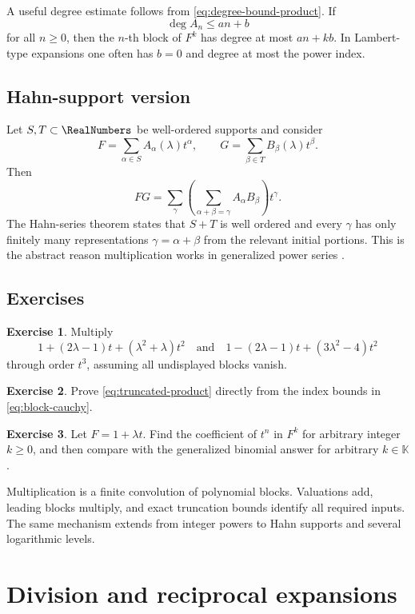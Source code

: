 \documentclass[11pt,openany]{book}
\theoremstyle{definition}
\newtheorem{exercise}{Exercise}[chapter]
\theoremstyle{plain}
\theoremstyle{remark}
\newcommand{\K}{\mathbb{K}}
\DeclareMathOperator{\polydeg}{deg}
\begin{document}
A useful degree estimate follows from \cref{eq:degree-bound-product}. If
\[
 \polydeg A_n\le an+b
\]
for all \(n\ge0\), then the \(n\)-th block of \(F^k\) has degree at most \(an+kb\). In Lambert-type expansions one often has \(b=0\) and degree at most the power index.

\section{Hahn-support version}
Let \(S,T\subset\RealNumbers\) be well-ordered supports and consider
\[
 F=\sum_{\alpha\in S}A_\alpha(\lambda)t^\alpha,
 \qquad
 G=\sum_{\beta\in T}B_\beta(\lambda)t^\beta.
\]
Then
\[
 FG=\sum_\gamma
 \left(\sum_{\alpha+\beta=\gamma}A_\alpha B_\beta\right)t^\gamma.
\]
The Hahn-series theorem states that \(S+T\) is well ordered and every \(\gamma\) has only finitely many representations \(\gamma=\alpha+\beta\) from the relevant initial portions. This is the abstract reason multiplication works in generalized power series \cite{hahn,vdhoeven-book}.

\section{Exercises}
\begin{exercise}
Multiply
\[
 1+(2\lambda-1)t+(\lambda^2+\lambda)t^2
\quad\text{and}\quad
 1-(2\lambda-1)t+(3\lambda^2-4)t^2
\]
through order \(t^3\), assuming all undisplayed blocks vanish.
\end{exercise}
\begin{exercise}
Prove \cref{eq:truncated-product} directly from the index bounds in \cref{eq:block-cauchy}.
\end{exercise}
\begin{exercise}
Let \(F=1+\lambda t\). Find the coefficient of \(t^n\) in \(F^k\) for arbitrary integer \(k\ge0\), and then compare with the generalized binomial answer for arbitrary \(k\in\K\).
\end{exercise}

\begin{summarybox}
Multiplication is a finite convolution of polynomial blocks. Valuations add, leading blocks multiply, and exact truncation bounds identify all required inputs. The same mechanism extends from integer powers to Hahn supports and several logarithmic levels.
\end{summarybox}

\chapter{Division and reciprocal expansions}\label{ch:division}
\end{document}
